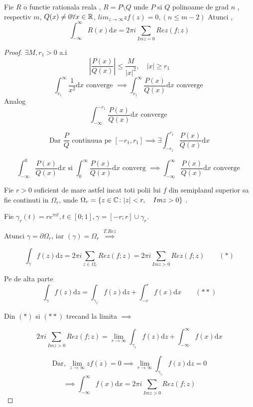 \begin{tip}
    Fie $R$ o functie rationala reala , $R=P\setminus Q$ unde $P$ si $Q$ polinoame de
    grad $n$ , respectiv $m$, $Q(x)\neq 0 \forall x\in \mathbb{R}$,
    $lim_{z\to\infty} z f(z) =0, (n \leq m-2)$
    Atunci ,
    \[
        \int_{-\infty}^{\infty} R(x) \mathrm{d} x = 2\pi i \sum_{Im z = 0} Rez(f;z)
    \]
    \begin{proof}
        $\exists M,r_1 >0 $ a.i
        \[
            \left|\frac{P(x)}{Q(x)} \right| \leq \frac{M}{|x|^2} , \quad |x| \geq r_1
        \]
        \[
            \int_{r_1}^{\infty} \frac{1}{x^2} \mathrm{d} x \text{ converge } \implies
            \int_{r_1}^{\infty} \frac{P(x)}{Q(x)} \mathrm{d} x \text{ converge }
        \]
        Analog
        \[
           \int_{ - \infty}^{- r_1} \frac{P(x)}{Q(x)} \mathrm{d} x \text{ converge }
        \]

				\[
					\text{Dar } \frac{P}{Q} \text{ continuua pe } [- r_1, r_1] \implies
            \exists \int_{- r_1}^{r_1} \frac{P(x)}{Q(x)} \mathrm{d} x
				\]

        \[
            \int_{- \infty}^{0} \frac{P(x)}{Q(x)} \mathrm{d} x \text{ si }
            \int_{0}^{\infty} \frac{P(x)}{Q(x)} \mathrm{d} x \text{ converg } \implies
            \int_{- \infty}^{\infty} \frac{P(x)}{Q(x)} \mathrm{d} x \text{ converge }
        \]

        Fie $r>0$ suficient de mare astfel incat toti polii lui $f$ din semiplanul
        superior sa fie continuti in $\Omega_r$, unde $\Omega_r = \{z\in\mathbb{C} \colon |z| < r,\quad Im z > 0\}$ .
       
				Fie $\gamma_r(t) = r e^{\pi i t}, t\in[0;1], \gamma=[-r;r]\cup \gamma_r$.
        
				Atunci $\gamma = \partial \Omega_r$, iar $(\gamma) = \Omega_r$
        $\overset{T. Rez}{\implies}$

        \begin{equation*}
            \int_{\gamma} f(z) \mathrm{d} z = 2 \pi i \sum_{z \in \Omega_r} Rez(f;z)
                = 2 \pi i \sum_{Im z >0} Rez(f;z)  \qquad (*)
        \end{equation*}

        Pe de alta parte
        \begin{equation*}
            \int_{\gamma} f(z) \mathrm{d} z = \int_{\gamma_r} f(z) \mathrm{d} z + \int_{-r}^{r} f(x) \mathrm{d} x \qquad (**)
        \end{equation*}

        Din $(*)$ si $(**)$ trecand la limita $\implies$

        \[
            2 \pi i \sum_{Im z >0} Rez(f;z) = \lim_{r\to \infty} \int_{\gamma_r} f(z) \mathrm{d} z
                + \int_{- \infty}^{\infty} f(x) \mathrm{d} x
        \]

        \[
            \text{Dar, } \lim_{z\to\infty} z f(z)=0 \implies \lim_{r\to\infty} \int_{\gamma_r} f(z) \mathrm{d} z = 0
        \]
        \[
            \implies \int_{- \infty}^{\infty} f(x) \mathrm{d} x = 2 \pi i \sum_{Im z >0} Rez(f;z)
        \]
    \end{proof}
\end{tip}
